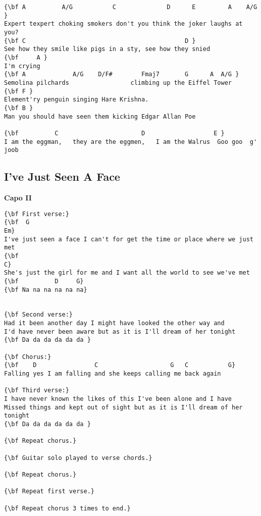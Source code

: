 \documentclass[a4paper]{article}
\begin{document}
\begin{Verbatim}[commandchars=\\\{\}]
{\bf A          A/G           C              D      E         A    A/G }
Expert texpert choking smokers don't you think the joker laughs at you? 
{\bf C                                            D }
See how they smile like pigs in a sty, see how they snied 
{\bf     A }
I'm crying 
{\bf A             A/G    D/F#        Fmaj7       G      A  A/G }
Semolina pilchards                 climbing up the Eiffel Tower 
{\bf F }
Element'ry penguin singing Hare Krishna.  
{\bf B }
Man you should have seen them kicking Edgar Allan Poe 

{\bf          C                       D                   E }
I am the eggman,   they are the eggmen,   I am the Walrus  Goo goo  g' joob
\end{Verbatim}
\newpage
\subsection{I've Just Seen A Face} %
\label{sub:I've Just Seen A Face}
{\bf Capo II}
\begin{Verbatim}[commandchars=\\\{\}]
{\bf First verse:}
{\bf  G                                                                    Em}
I've just seen a face I can't for get the time or place where we just met
{\bf                                                                   C}
She's just the girl for me and I want all the world to see we've met
{\bf          D     G}
{\bf Na na na na na na}


{\bf Second verse:}
Had it been another day I might have looked the other way and
I'd have never been aware but as it is I'll dream of her tonight
{\bf Da da da da da da }

{\bf Chorus:}
{\bf    D                C                    G   C           G}
Falling yes I am falling and she keeps calling me back again

{\bf Third verse:}
I have never known the likes of this I've been alone and I have 
Missed things and kept out of sight but as it is I'll dream of her tonight
{\bf Da da da da da da }

{\bf Repeat chorus.}

{\bf Guitar solo played to verse chords.}

{\bf Repeat chorus.}

{\bf Repeat first verse.}

{\bf Repeat chorus 3 times to end.}

\end{Verbatim}
\newpage
\end{document}
